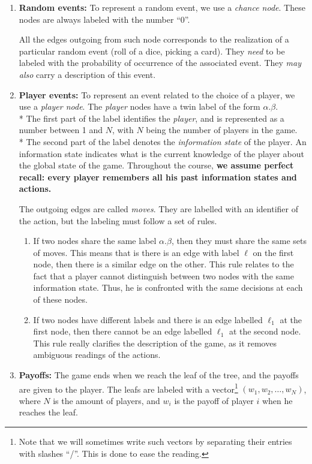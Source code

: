 \begin{enumerate}
\item \textbf{Random events:}
To represent a random event, we use a \emph{chance node}. 
These nodes are always labeled with the number ``0''.

All the edges outgoing from such node corresponds to the realization of a particular random event (roll of a dice, picking a card).
 They \emph{need} to be labeled with the probability of occurrence of the associated event. They \emph{may also} carry a description of this event.
 
\item \textbf{Player events:}
To represent an event related to the choice of a player, 
we use a \emph{player node}.
The \emph{player} nodes have a twin label of the form 
$\alpha.\beta$. \\*
 The first part of the label identifies the \emph{player}, 
 and is represented as a number between 1 and $N$, 
 with $N$ being the number of players in the game.\\*
The second part of the label 
 denotes the \emph{information state} of the player. 
 An information state indicates what is the current knowledge 
 of the player about the global state of the game. 
 Throughout the course, \textbf{we assume perfect recall: 
 every player remembers all his past information states and actions.}


The outgoing edges are called \emph{moves}. 
They are labelled with an identifier of the action, but the labeling must follow a set of rules.
\begin{enumerate}
\item If two nodes share the same label $\alpha.\beta$, then they must share the same sets of moves. 
This means that is there is an edge with label $\ell$ on the first node, then there is a similar edge on the other.
This rule relates to the fact that 
a player cannot distinguish between two nodes with the same information state.
Thus, he is confronted with the same decisions at each of these nodes.

\item If two nodes have different labels and there is an edge labelled $\ell_1$ at the first node, 
then there cannot be an edge labelled $\ell_1$ at the second node.
This rule really clarifies the description of the game, as it removes ambiguous readings of the actions.


\end{enumerate}
\item \textbf{Payoffs:} The game ends when we reach the leaf of the tree, and the payoffs are given to the player. 
The leafs are labeled with a vector\footnote{Note that we will sometimes write such vectors by separating their entries with slashes ``/''. This is done to ease the reading.} $(w_1, w_2, \ldots, w_N)$, where $N$ is the amount of players, and $w_i$ is the payoff of player $i$ when he reaches the leaf.
\end{enumerate}

